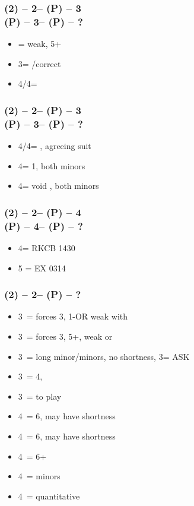 \subsubsection*{(2\hearts) -- 2\nt -- (P) -- 3\hearts \\
                (P) -- 3\spades -- (P) -- ?}
\begin{itemize}
    \item \pass = weak, 5+\spades
    \item 3\nt = \pass/correct
    \item 4\clubs/4\diams = \nat
\end{itemize}

\subsubsection*{(2\hearts) -- 2\nt -- (P) -- 3\spades \\
                (P) -- 3\nt -- (P) -- ?}
\begin{itemize}
    \item 4\clubs/4\diams = \nat, agreeing suit
    \item 4\hearts = 1\spades, both minors
    \item 4\spades = void \spades, both minors
\end{itemize}

\subsubsection*{(2\hearts) -- 2\nt -- (P) -- 4\hearts \\
                (P) -- 4\spades -- (P) -- ?}
\begin{itemize}
    \item 4\nt = RKCB 1430
    \item 5 = EX 0314
\end{itemize}

\subsubsection*{(2\spades) -- 2\nt -- (P) -- ?}
\begin{itemize}
    \item 3\clubs\ = forces 3\diams, 1-\spades \gf OR weak with \diams
    \item 3\diams\ = forces 3\hearts, 5+\hearts, weak or \gf
    \item 3\hearts\ = long minor/minors, no \spades shortness, 3\spades = ASK
    \item 3\spades\ = 4\hearts, \gf
    \item 3\nt\ = to play
    \item 4\clubs\ = 6\hearts, may have shortness
    \item 4\diams\ = 6\hearts, may have shortness
    \item 4\hearts\ = 6+\hearts
    \item 4\spades\ = minors
    \item 4\nt\ = quantitative
\end{itemize}


